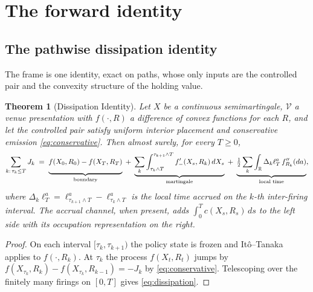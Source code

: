 \documentclass[11pt,a4paper]{article}
\theoremstyle{definition}
\theoremstyle{plain}
\newtheorem{theorem}{Theorem}
\theoremstyle{remark}
\begin{document}
\section{The forward identity}\label{sec:identity}

\subsection{The pathwise dissipation identity}\label{sec:pathwise}

The frame is one identity, exact on paths, whose only inputs are the controlled pair and the convexity structure of the holding value.

\begin{theorem}[Dissipation Identity]\label{thm:dissipation}
Let $X$ be a continuous semimartingale, $\mathcal{V}$ a venue presentation with $f(\cdot, R)$ a difference of convex functions for each $R$, and let the controlled pair 
satisfy uniform interior placement and conservative emission \eqref{eq:conservative}. Then almost surely, for every $T \ge 0$,
\begin{equation}\label{eq:dissipation}
\sum_{k:\, \tau_k \le T} J_k
\;=\; \underbrace{f(X_0, R_0) - f(X_T, R_T)
  \vphantom{\int_{\tau_k \wedge T}^{\tau_{k+1} \wedge T}}
  }_{\textnormal{boundary}}
\;+\; \underbrace{\sum_k \int_{\tau_k \wedge T}^{\tau_{k+1} \wedge T}
f'_-(X_s, R_k)\, dX_s}_{\textnormal{martingale}}
\;+\; \underbrace{\tfrac12 \sum_k \int_{\mathbb{R}}
\Delta_k \ell^a_T \,f''_{R_k}(da)
  \vphantom{\int_{\tau_k \wedge T}^{\tau_{k+1} \wedge T}}
  }_{\textnormal{local time}},
\end{equation}
where $\Delta_k \ell^a_T = \ell^a_{\tau_{k+1} \wedge T} -
\ell^a_{\tau_k \wedge T}$ is the local time accrued on the $k$-th inter-firing interval. The accrual channel, when present, adds
$\int_0^T c(X_s, R_s)\, ds$ to the left side with its occupation representation on the right.
\end{theorem}

\begin{proof}
On each interval $[\tau_k, \tau_{k+1})$ the policy state is frozen and It\^o--Tanaka applies to $f(\cdot, R_k)$.\cite{revuzyor} At
$\tau_k$ the process $f(X_t, R_t)$ jumps by $f(X_{\tau_k},R_k) - f(X_{\tau_k}, R_{k-1}) = -J_k$ by
\eqref{eq:conservative}. Telescoping over the finitely many firings on $[0,T]$ gives \eqref{eq:dissipation}.
\end{proof}
\end{document}
